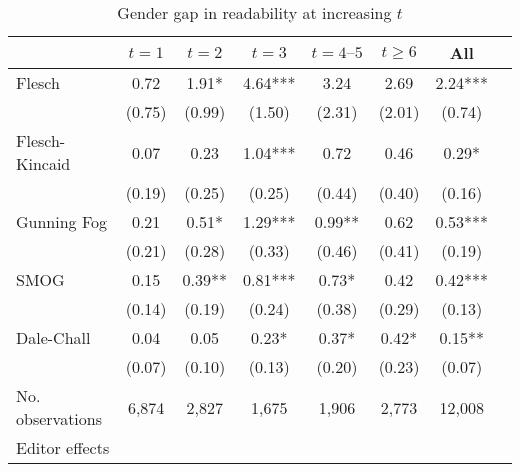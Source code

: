 \begin{table}
    \footnotesize
    \centering
    \begin{threeparttable}
        \caption{Gender gap in readability at increasing \(t\)}
        \label{tableH2_FemRatio}
        \begin{tabular}{p{3cm}S@{}S@{}S@{}S@{}S@{}S@{}S@{}}
            \toprule
            &{\(t=1\)}&{\(t=2\)}&{\(t=3\)}&{\(t=4\text{--}5\)}&{\(t\ge6\)}&{All}\\
            \midrule
            Flesch                        &        0.72   &        1.91*  &        4.64***&        3.24   &        2.69   &        2.24***\\
                                          &      (0.75)   &      (0.99)   &      (1.50)   &      (2.31)   &      (2.01)   &      (0.74)   \\
            Flesch-Kincaid                &        0.07   &        0.23   &        1.04***&        0.72   &        0.46   &        0.29*  \\
                                          &      (0.19)   &      (0.25)   &      (0.25)   &      (0.44)   &      (0.40)   &      (0.16)   \\
            Gunning Fog                   &        0.21   &        0.51*  &        1.29***&        0.99** &        0.62   &        0.53***\\
                                          &      (0.21)   &      (0.28)   &      (0.33)   &      (0.46)   &      (0.41)   &      (0.19)   \\
            SMOG                          &        0.15   &        0.39** &        0.81***&        0.73*  &        0.42   &        0.42***\\
                                          &      (0.14)   &      (0.19)   &      (0.24)   &      (0.38)   &      (0.29)   &      (0.13)   \\
            Dale-Chall                    &        0.04   &        0.05   &        0.23*  &        0.37*  &        0.42*  &        0.15** \\
                                          &      (0.07)   &      (0.10)   &      (0.13)   &      (0.20)   &      (0.23)   &      (0.07)   \\
            \midrule
            No. observations              &       6,874   &       2,827   &       1,675   &       1,906   &       2,773   &      12,008   \\
            \midrule
            Editor effects       &           {}   &           {}   &           {}   &           {}   &           {}   &           {}   \\

\end{tabular}
\end{threeparttable}
\end{table}

